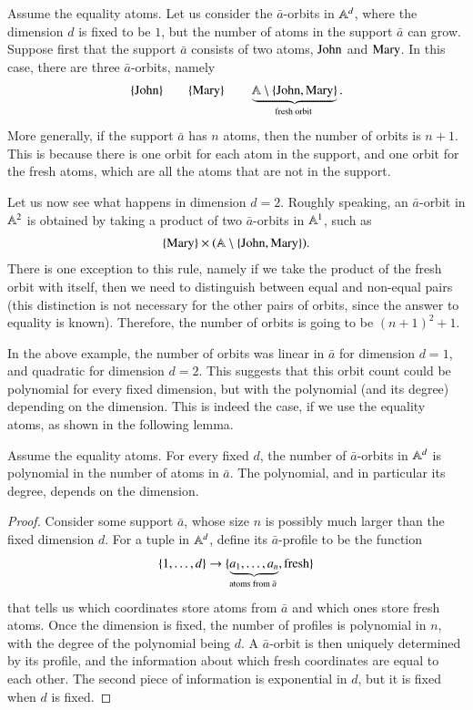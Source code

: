 \begin{myexample} Assume the equality atoms.
    Let us consider the $\bar a$-orbits in $\mathbb A^d$, where the dimension $d$ is fixed to be $1$, but the number of atoms in the support $\bar a$ can grow. Suppose first that the support $\bar a$ consists of two atoms, $\text{John}$ and $\text{Mary}$. In this case, there are three $\bar a$-orbits, namely
\begin{align*}
    \set{\john}
    \qquad \set{\mary}
    \qquad 
    \myunderbrace{\atoms \setminus \set{\john, \mary}}{fresh orbit}.
\end{align*}
More generally, if the support $\bar a$ has $n$ atoms, then the number of orbits is $n+1$. This is because there is one orbit for each atom in the support, and one orbit for the fresh atoms, which are all the atoms that are not in the support.

Let us now see what happens in dimension $d=2$. Roughly speaking, an $\bar a$-orbit in $\mathbb A^2$ is obtained by taking a product of two $\bar a$-orbits in $\mathbb A^1$, such as 
\begin{align*}
\{\text{Mary}\} \times (\mathbb A \setminus \{\text{John}, \text{Mary}\}).
\end{align*}
There is one exception to this rule, namely if we take the product of the fresh orbit with itself, then we need to distinguish between equal and non-equal pairs (this distinction is not necessary for the other pairs of orbits, since the answer to equality is known). Therefore, the number of orbits is going to be $(n+1)^2 + 1$. 
\end{myexample}

In the above example, the number of orbits was linear in $\bar a$ for dimension $d=1$, and quadratic for dimension $d=2$. This suggests that this orbit count could be polynomial for every fixed dimension, but with the polynomial (and its degree) depending on the dimension. This is indeed the case, if we use the equality atoms, as shown in the following lemma.
\begin{lemma}\label{lem:atoms-plynomial-orbit-count}
    Assume the equality atoms. For every fixed $d$, the number of $\bar a$-orbits in $\mathbb A^d$ is polynomial in the number of atoms in $\bar a$. The polynomial, and in particular its degree, depends on the dimension.
\end{lemma}
\begin{proof}
    Consider  some support $\bar a$, whose size $n$ is possibly much larger than the fixed dimension $d$. 
    For a tuple in $\mathbb A^d$, define its $\bar a$-profile to be the function 
    \begin{align*}
    \set{1,\ldots,d} \to    \set{\myunderbrace{a_1,\ldots,a_n}{atoms from $\bar a$},\text{fresh}}
    \end{align*}
    that tells us which coordinates store atoms from $\bar a$ and which ones store fresh atoms. Once the dimension is fixed, the number of profiles is polynomial in $n$, with the degree of the polynomial being $d$. A $\bar a$-orbit is then uniquely determined by its profile, and the information about which fresh coordinates are equal to each other. The second piece of information is exponential in $d$, but it is fixed when $d$ is fixed.
\end{proof}


